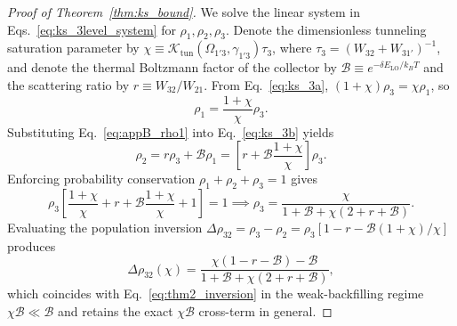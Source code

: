 \documentclass[11pt,letterpaper]{article}
\begin{document}
\begin{proof}[Proof of Theorem~\ref{thm:ks_bound}]
We solve the linear system in Eqs.~\eqref{eq:ks_3level_system} for $\rho_1, \rho_2, \rho_3$. Denote the dimensionless tunneling saturation parameter by $\chi \equiv \mathcal{K}_{\mathrm{tun}}(\Omega_{1'3}, \gamma_{1'3})\tau_3$, where $\tau_3 = (W_{32} + W_{31'})^{-1}$, and denote the thermal Boltzmann factor of the collector by $\mathcal{B} \equiv e^{-\delta E_{\mathrm{LO}}/k_B T}$ and the scattering ratio by $r \equiv W_{32}/W_{21}$. From Eq.~\eqref{eq:ks_3a}, $(1 + \chi)\rho_3 = \chi \rho_1$, so
\begin{equation}
\rho_1 = \frac{1 + \chi}{\chi}\rho_3.
\label{eq:appB_rho1}
\end{equation}
Substituting Eq.~\eqref{eq:appB_rho1} into Eq.~\eqref{eq:ks_3b} yields
\begin{equation}
\rho_2 = r \rho_3 + \mathcal{B}\rho_1 = \left[ r + \mathcal{B}\frac{1 + \chi}{\chi} \right]\rho_3.
\label{eq:appB_rho2}
\end{equation}
Enforcing probability conservation $\rho_1 + \rho_2 + \rho_3 = 1$ gives
\begin{equation}
\rho_3 \left[ \frac{1 + \chi}{\chi} + r + \mathcal{B}\frac{1 + \chi}{\chi} + 1 \right] = 1 \implies \rho_3 = \frac{\chi}{1 + \mathcal{B} + \chi(2 + r + \mathcal{B})}.
\label{eq:appB_rho3}
\end{equation}
Evaluating the population inversion $\Delta\rho_{32} = \rho_3 - \rho_2 = \rho_3[1 - r - \mathcal{B}(1 + \chi)/\chi]$ produces
\begin{equation}
\Delta\rho_{32}(\chi) = \frac{\chi(1 - r - \mathcal{B}) - \mathcal{B}}{1 + \mathcal{B} + \chi(2 + r + \mathcal{B})},
\label{eq:appB_dn_chi}
\end{equation}
which coincides with Eq.~\eqref{eq:thm2_inversion} in the weak-backfilling regime $\chi\mathcal{B} \ll \mathcal{B}$ and retains the exact $\chi\mathcal{B}$ cross-term in general.


\end{proof}
\end{document}
